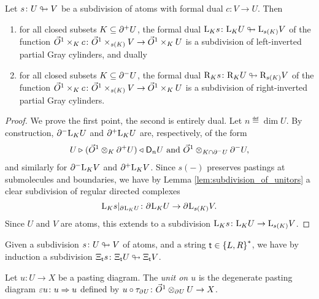 \begin{lem} \label{lem:subdivision_of_invertors}
    Let \( s \colon U \looparrowright V \) be a subdivision of atoms with formal dual \( c \colon V \to U \).
    Then
    \begin{enumerate}
        \item for all closed subsets \( K \subseteq \partial_{}^{+} U \), the formal dual \( \mathrm{L}_{K} s \colon \mathrm{L}_{K} U \looparrowright \mathrm{L}_{s(K)} V \) of the function \( \vec{O}^{1} \times_K c \colon \vec{O}^{1} \times_{s(K)} V \to \vec{O}^{1} \times_K U \) is a subdivision of left-inverted partial Gray cylinders, and dually
        \item for all closed subsets \( K \subseteq \partial_{}^{-} U \), the formal dual \( \mathrm{R}_{K} s \colon \mathrm{R}_{K} U \looparrowright \mathrm{R}_{s(K)} V \) of the function \( \vec{O}^{1} \times_K c \colon \vec{O}^{1} \times_{s(K)} V \to \vec{O}^{1} \times_K U \)  is a subdivision of right-inverted partial Gray cylinders.
    \end{enumerate}
\end{lem}
\begin{proof}
    We prove the first point, the second is entirely dual.
    Let \( n \eqdef \dim U \).
    By construction, \( \partial_{}^{-} \mathrm{L}_{K} U \) and \( \partial_{}^{+} \mathrm{L}_{K} U \) are, respectively, of the form
    \begin{equation*}
        U \triangleright_{} (\vec{O}^{1} \otimes_K \partial_{}^{+} U) \prescript{}{\!}{\triangleleft}\; \mathsf{D}_{n}{U} \text{ and } \vec{O}^{1} \otimes_{K \cap \partial_{}^{-} U} \partial_{}^{-} U,
    \end{equation*}
    and similarly for \( \partial_{}^{-} \mathrm{L}_{K} V \) and \( \partial_{}^{+} \mathrm{L}_{K} V \).
    Since \( s(-) \) preserves pastings at submolecules and boundaries, we have by Lemma \ref{lem:subdivision_of_unitors} a clear subdivision of regular directed complexes 
    \begin{equation*}
        \restr{\lcyl{K} s}{\bd{}{} \lcyl{K} U} \colon \bd{}{} \lcyl{K} U \to \bd{}{} \lcyl{s(K)} V.
    \end{equation*}
    Since \( U \) and \( V \) are atoms, this extends to a subdivision \( \mathrm{L}_{K} s \colon \mathrm{L}_{K} U \to \mathrm{L}_{s(K)} V \).
\end{proof}

\begin{rmk}
    Given a subdivision \( s \colon U \looparrowright V \) of atoms, and a string \( \mathsf{t} \in \left\{ {L, R} \right\}^* \), we have by induction a subdivision \( \Xi_{\mathsf{t}} s \colon \Xi_{\mathsf{t}} U \looparrowright \Xi_{\mathsf{t}} V \).
\end{rmk}

\begin{dfn} [Unit]
    Let \( u \colon U \to X \) be a pasting diagram.
    The \emph{unit on \( u \)} is the degenerate pasting diagram \( \varepsilon u \colon u \Rightarrow u \) defined by \( u \circ \tau_{\partial_{}^{} U} \colon \vec{O}^{1} \otimes_{\partial_{}^{}U} U \to X \).
\end{dfn}

